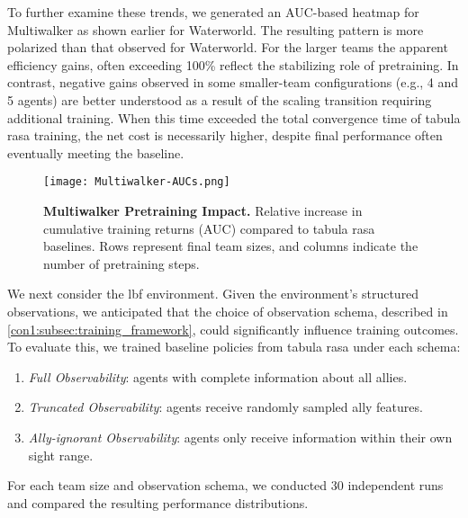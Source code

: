 \documentclass{article}
\begin{document}
To further examine these trends, we generated an AUC-based heatmap for Multiwalker as shown 
earlier for Waterworld. The resulting pattern is more polarized than that observed for Waterworld.
For the larger teams the apparent efficiency gains, often exceeding 100\%
reflect the stabilizing role of pretraining.
In contrast, negative gains observed in some smaller-team configurations (e.g., 4 and 5 agents) 
are better understood as a result of the scaling transition requiring additional training. 
When this time exceeded the total convergence time of tabula rasa training, the net cost 
is necessarily higher, despite final performance often eventually meeting the baseline.

\begin{figure}[!ht]
    \centering
    \texttt{[image: Multiwalker-AUCs.png]}
    \caption{\textbf{Multiwalker Pretraining Impact.} 
    Relative increase in cumulative training returns (AUC) compared to tabula rasa baselines. 
    Rows represent final team sizes, and columns indicate the number of pretraining steps.}
    \label{con1:fig:multiwalker-aucs}
\end{figure}

We next consider the \gls{lbf} environment.
Given the environment's structured observations, we anticipated that the
choice of observation schema, described in \cref{con1:subsec:training_framework},
could significantly influence training outcomes.
To evaluate this, we trained baseline policies from tabula rasa under each schema:
\begin{enumerate}
\item \emph{Full Observability}: agents with complete information about all allies.
\item \emph{Truncated Observability}: agents receive randomly sampled ally features.
\item \emph{Ally-ignorant Observability}: agents only receive information within 
    their own sight range.
\end{enumerate}
For each team size and observation schema, we conducted 30 independent runs
and compared the resulting performance distributions.
\end{document}
